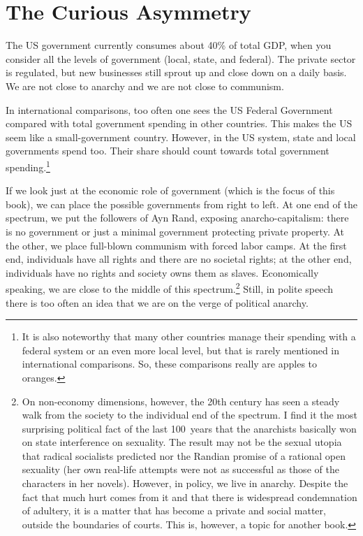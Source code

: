 \chapter{The Curious Asymmetry}

The US government currently consumes about 40\% of total GDP, when you consider
all the levels of government (local, state, and federal). The private sector is
regulated, but new businesses still sprout up and close down on a daily basis.
We are not close to anarchy and we are not close to communism.

In international comparisons, too often one sees the US Federal Government
compared with total government spending in other countries. This makes the US
seem like a small-government country. However, in the US system, state and
local governments spend too. Their share should count towards total government
spending.\footnote{It is also noteworthy that many other countries manage their
spending with a federal system or an even more local level, but that is rarely
mentioned in international comparisons. So, these comparisons really are apples
to oranges.}

If we look just at the economic role of government (which is the focus of this
book), we can place the possible governments from right to left. At one end of
the spectrum, we put the followers of Ayn Rand, exposing anarcho-capitalism:
there is no government or just a minimal government protecting private
property. At the other, we place full-blown communism with forced labor camps.
At the first end, individuals have all rights and there are no societal rights;
at the other end, individuals have no rights and society owns them as slaves.
Economically speaking, we are close to the middle of this spectrum.\footnote{On
non-economy dimensions, however, the 20th century has seen a steady walk from
the society to the individual end of the spectrum. I find it the most
surprising political fact of the last 100~years that the anarchists basically
won on state interference on sexuality. The result may not be the sexual utopia
that radical socialists predicted nor the Randian promise of a rational open
sexuality (her own real-life attempts were not as successful as those of the
characters in her novels). However, in policy, we live in anarchy. Despite the
fact that much hurt comes from it and that there is widespread condemnation of
adultery, it is a matter that has become a private and social matter, outside
the boundaries of courts.  This is, however, a topic for another book.} Still,
in polite speech there is too often an idea that we are on the verge of
political anarchy.


